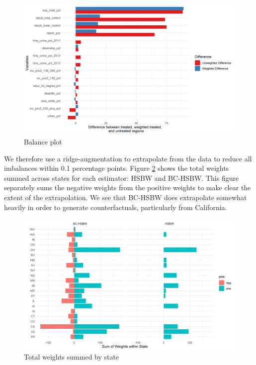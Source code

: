 \documentclass[12pt]{article}
\begin{document}
\begin{figure}[B]
\begin{center}
    \includegraphics[scale=0.6]{01_Plots/balance-plot-etu.png}
    \caption{Balance plot}
    \label{loveplot}
\end{center}
\end{figure}

We therefore use a ridge-augmentation to extrapolate from the data to reduce all imbalances within 0.1 percentage points. Figure \ref{statewghts} shows the total weights summed across states for each estimator: HSBW and BC-HSBW. This figure separately sums the negative weights from the positive weights to make clear the extent of the extrapolation. We see that BC-HSBW does extrapolate somewhat heavily in order to generate counterfactuals, particularly from California. 

\begin{figure}[B]
\begin{center}
    \includegraphics[scale=0.6]{01_Plots/weights-by-state-main.png}
    \caption{Total weights summed by state}
    \label{statewghts}
\end{center}
\end{figure}
\end{document}
